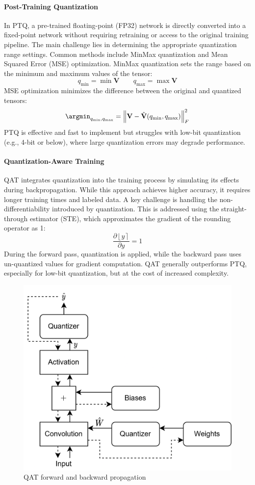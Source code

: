 \paragraph*{Post-Training Quantization}
In PTQ, a pre-trained floating-point (FP32) network is directly converted into a fixed-point network without requiring retraining or access to the original training pipeline. 
The main challenge lies in determining the appropriate quantization range settings. 
Common methods include MinMax quantization and Mean Squared Error (MSE) optimization.
MinMax quantization sets the range based on the minimum and maximum values of the tensor:
\[q_{\min}=\min\mathbf{V} \qquad q_{\max}=\max\mathbf{V}\]
MSE optimization minimizes the difference between the original and quantized tensors:
\[\argmin_{q_{\min},q_{\max}}={\left\lVert \mathbf{V}-\hat{\mathbf{V}}(q_{\min},q_{\max})\right\rVert}_F^2 \]
PTQ is effective and fast to implement but struggles with low-bit quantization (e.g., 4-bit or below), where large quantization errors may degrade performance.

\paragraph*{Quantization-Aware Training}
QAT integrates quantization into the training process by simulating its effects during backpropagation. 
While this approach achieves higher accuracy, it requires longer training times and labeled data. 
A key challenge is handling the non-differentiability introduced by quantization. 
This is addressed using the straight-through estimator (STE), which approximates the gradient of the rounding operator as 1:
\[\dfrac{\partial\left\lfloor y\right\rceil}{\partial y}=1\]
During the forward pass, quantization is applied, while the backward pass uses un-quantized values for gradient computation. 
QAT generally outperforms PTQ, especially for low-bit quantization, but at the cost of increased complexity.
\begin{figure}[H]
    \centering
    \includegraphics[width=0.5\linewidth]{images/eeai10.png}
    \caption{QAT forward and backward propagation}
\end{figure}


